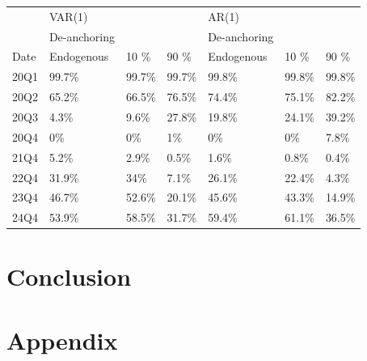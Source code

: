 \documentclass[12pt]{article}
\numberwithin{equation}{section}
\begin{document}
\begin{table}[hbt!]
\begin{tabular}{l|lll|lll}
& VAR(1) & & & AR(1) & & \\
& De-anchoring & & & De-anchoring & & \\
\hline
\hline
Date & Endogenous & 10 \% & 90 \% & Endogenous & 10 \% & 90 \% \\
20Q1 & 99.7\% & 99.7\% & 99.7\% & 99.8\% &99.8\% & 99.8\% \\
20Q2 & 65.2\% & 66.5\% & 76.5\% & 74.4\% &75.1\% &82.2\% \\
20Q3 & 4.3\% & 9.6\% & 27.8\% & 19.8\% & 24.1\% & 39.2\% \\
20Q4 & 0\%  & 0\% &  1\% & 0\% &0\% &7.8\% \\
\hline
\hline
21Q4 & 5.2\% & 2.9\% & 0.5\% & 1.6\% &0.8\% &0.4\% \\
\hline
22Q4 & 31.9\% & 34\% & 7.1\% & 26.1\% &22.4\%& 4.3\% \\
\hline
23Q4 & 46.7\% & 52.6\% & 20.1\% & 45.6\% &43.3\% &14.9\%\\
\hline
24Q4 & 53.9\% & 58.5\% & 31.7\% & 59.4\% &61.1\% &36.5\%\\
\hline
\hline

\end{tabular}
\end{table}


\FloatBarrier

\section{Conclusion}

\FloatBarrier

\section*{Appendix}
\end{document}
